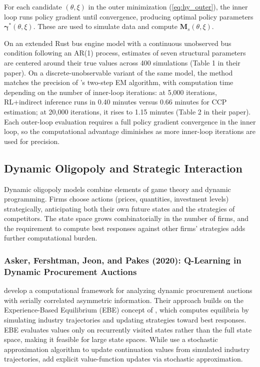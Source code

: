 For each candidate $(\theta, \xi)$ in the outer minimization (\ref{eq:hy_outer}), the inner loop runs policy gradient until convergence, producing optimal policy parameters $\boldsymbol{\gamma}^*(\theta, \xi)$. These are used to simulate data and compute $\mathbf{M}_s(\theta, \xi)$.

On an extended Rust bus engine model with a continuous unobserved bus condition following an AR(1) process, estimates of seven structural parameters are centered around their true values across 400 simulations (Table 1 in their paper). On a discrete-unobservable variant of the same model, the method matches the precision of \citet{ArcidiaconoMiller2011}'s two-step EM algorithm, with computation time depending on the number of inner-loop iterations: at 5,000 iterations, RL+indirect inference runs in 0.40 minutes versus 0.66 minutes for CCP estimation; at 20,000 iterations, it rises to 1.15 minutes (Table 2 in their paper). Each outer-loop evaluation requires a full policy gradient convergence in the inner loop, so the computational advantage diminishes as more inner-loop iterations are used for precision.


\subsection{Dynamic Oligopoly and Strategic Interaction}

Dynamic oligopoly models combine elements of game theory and dynamic programming. Firms choose actions (prices, quantities, investment levels) strategically, anticipating both their own future states and the strategies of competitors. The state space grows combinatorially in the number of firms, and the requirement to compute best responses against other firms' strategies adds further computational burden.


\subsubsection{Asker, Fershtman, Jeon, and Pakes (2020): Q-Learning in Dynamic Procurement Auctions}

\citet{AskerEtAl2020} develop a computational framework for analyzing dynamic procurement auctions with serially correlated asymmetric information. Their approach builds on the Experience-Based Equilibrium (EBE) concept of \citet{FershtmanPakes2012}, which computes equilibria by simulating industry trajectories and updating strategies toward best responses. EBE evaluates values only on recurrently visited states rather than the full state space, making it feasible for large state spaces. While \citet{FershtmanPakes2012} use a stochastic approximation algorithm to update continuation values from simulated industry trajectories, \citet{AskerEtAl2020} add explicit value-function updates via stochastic approximation.


